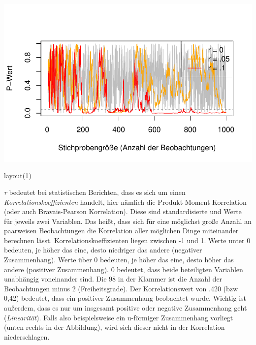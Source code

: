 \documentclass[
  letterpaper,
  DIV=11,
  numbers=noendperiod]{scrreprt}
\newenvironment{Shaded}{\begin{snugshade}}{\end{snugshade}}
\newcommand{\DecValTok}[1]{\textcolor[rgb]{0.68,0.00,0.00}{#1}}
\newcommand{\FunctionTok}[1]{\textcolor[rgb]{0.28,0.35,0.67}{#1}}
\newcommand{\NormalTok}[1]{\textcolor[rgb]{0.00,0.23,0.31}{#1}}
\begin{document}
\includegraphics{probleme_methoden_files/figure-pdf/unnamed-chunk-2-1.pdf}

\begin{Shaded}
\begin{Highlighting}[]
\FunctionTok{layout}\NormalTok{(}\DecValTok{1}\NormalTok{)}
\end{Highlighting}
\end{Shaded}

\begin{tcolorbox}[enhanced jigsaw, left=2mm, colback=white, colframe=quarto-callout-note-color-frame, opacitybacktitle=0.6, opacityback=0, title=\textcolor{quarto-callout-note-color}{\faInfo}\hspace{0.5em}{Korrelation}, toptitle=1mm, coltitle=black, colbacktitle=quarto-callout-note-color!10!white, titlerule=0mm, bottomtitle=1mm, leftrule=.75mm, breakable, rightrule=.15mm, bottomrule=.15mm, toprule=.15mm, arc=.35mm]

\emph{r} bedeutet bei statistischen Berichten, dass es sich um einen
\emph{Korrelationskoeffizienten} handelt, hier nämlich die
Produkt-Moment-Korrelation (oder auch Bravais-Pearson Korrelation).
Diese sind standardisierte und Werte für jeweils zwei Variablen. Das
heißt, dass sich für eine möglichst große Anzahl an paarweisen
Beobachtungen die Korrelation aller möglichen Dinge miteinander
berechnen lässt. Korrelationskoeffizienten liegen zwischen -1 und 1.
Werte unter 0 bedeuten, je höher das eine, desto niedriger das andere
(negativer Zusammenhang). Werte über 0 bedeuten, je höher das eine,
desto höher das andere (positiver Zusammenhang). 0 bedeutet, dass beide
beteiligten Variablen unabhängig voneinander sind. Die 98 in der Klammer
ist die Anzahl der Beobachtungen minus 2 (Freiheitsgrade). Der
Korrelationswert von .420 (bzw 0,42) bedeutet, dass ein positiver
Zusammenhang beobachtet wurde. Wichtig ist außerdem, dass es nur um
insgesamt positive oder negative Zusammenhang geht (\emph{Linearität}).
Falls also beispielsweise ein u-förmiger Zusammenhang vorliegt (unten
rechts in der Abbildung), wird sich dieser nicht in der Korrelation
niederschlagen.

\end{tcolorbox}
\end{document}
